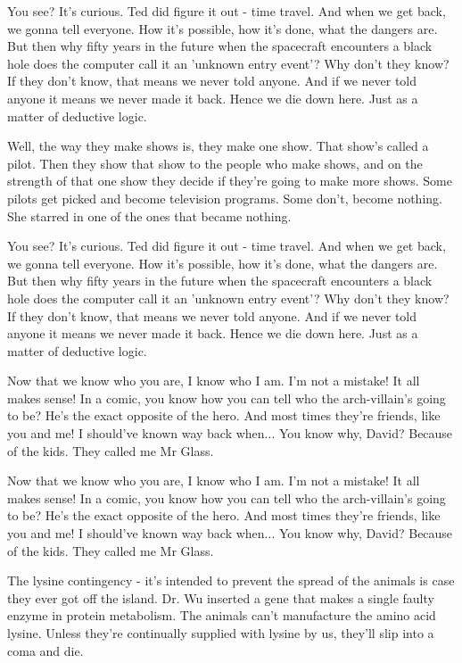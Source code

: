 \documentclass{book}
\begin{document}
You see? It's curious. Ted did figure it out - time travel. And when we get back, we gonna tell everyone. How it's possible, how it's done, what the dangers are. But then why fifty years in the future when the spacecraft encounters a black hole does the computer call it an 'unknown entry event'? Why don't they know? If they don't know, that means we never told anyone. And if we never told anyone it means we never made it back. Hence we die down here. Just as a matter of deductive logic.

Well, the way they make shows is, they make one show. That show's called a pilot. Then they show that show to the people who make shows, and on the strength of that one show they decide if they're going to make more shows. Some pilots get picked and become television programs. Some don't, become nothing. She starred in one of the ones that became nothing.

You see? It's curious. Ted did figure it out - time travel. And when we get back, we gonna tell everyone. How it's possible, how it's done, what the dangers are. But then why fifty years in the future when the spacecraft encounters a black hole does the computer call it an 'unknown entry event'? Why don't they know? If they don't know, that means we never told anyone. And if we never told anyone it means we never made it back. Hence we die down here. Just as a matter of deductive logic.

Now that we know who you are, I know who I am. I'm not a mistake! It all makes sense! In a comic, you know how you can tell who the arch-villain's going to be? He's the exact opposite of the hero. And most times they're friends, like you and me! I should've known way back when... You know why, David? Because of the kids. They called me Mr Glass.

Now that we know who you are, I know who I am. I'm not a mistake! It all makes sense! In a comic, you know how you can tell who the arch-villain's going to be? He's the exact opposite of the hero. And most times they're friends, like you and me! I should've known way back when... You know why, David? Because of the kids. They called me Mr Glass.

The lysine contingency - it's intended to prevent the spread of the animals is case they ever got off the island. Dr. Wu inserted a gene that makes a single faulty enzyme in protein metabolism. The animals can't manufacture the amino acid lysine. Unless they're continually supplied with lysine by us, they'll slip into a coma and die.
\end{document}
